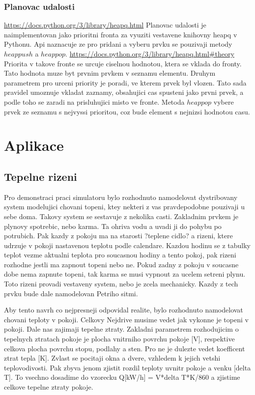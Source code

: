 \subsection{Planovac udalosti}
\url{https://docs.python.org/3/library/heapq.html}
Planovac udalosti je naimplementovan jako prioritni fronta za vyuziti vestavene knihovny heapq v Pythonu. Api naznacuje ze pro pridani a vyberu prvku se pouzivaji metody $heappush$ a $heappop$. \url{https://docs.python.org/3/library/heapq.html#theory} Priorita v takove fronte se urcuje ciselnou hodnotou, ktera se vklada do fronty. Tato hodnota muze byt prvnim prvkem v seznamu elementu. Druhym parametrem pro urceni priority je poradi, ve kterem prvek byl vlozen. Tato sada pravidel umoznuje vkladat zaznamy, obsahujici cas spusteni jako prvni prvek, a podle toho se zaradi na prisluhujici misto ve fronte. Metoda $heappop$ vybere prvek ze seznamu s nejvyssi prioritou, coz bude element s nejnizsi hodnotou casu.
\chapter{Aplikace}
\section{Tepelne rizeni}
Pro demonstraci praci simulatoru bylo rozhodnuto namodelovat dystribovany system modelujici chovani topeni, ktey nekteri z vas pravdepodobne pouzivaji u sebe doma. Takovy system se sestavuje z nekolika casti. Zakladnim prvkem je plynovy spotrebic, nebo karma. Ta ohriva vodu a uvadi ji do pohybu po potrubich. Pak kazdy z pokoju ma na starosti ?teplene cidlo? a rizeni, ktere udrzuje v pokoji nastavenou teplotu podle calendare. Kazdou hodinu se z tabulky teplot vezme aktualni teplota pro soucasnou hodiny a tento pokoj, pak rizeni rozhodne jestli ma zapnout topeni nebo ne. Pokud zadny z pokoju v soucasne dobe nema zapnute topeni, tak karma se musi vypnout za ucelem setreni plynu. Toto rizeni provadi vestaveny system, nebo je zcela mechanicky. Kazdy z tech prvku bude dale namodelovan Petriho sitmi.

Aby tento navrh co nejpresneji odpovidal realite, bylo rozhodnuto namodelovat chovani teploty v pokoji.
Celkovy Nejdrive musime vedet jak vykonne je topeni v pokoji. Dale nas zajimaji tepelne ztraty. Zakladni parametrem rozhodujicim o tepelnych ztratach pokoje je plocha vnitrniho povrchu pokoje [V], respektive celkova plocha povrchu stopu, podlahy a sten. Pro ne je dulezte vedet koefficent ztrat tepla [K]. Zvlast se pocitaji okna a dvere, vzhledem k jejich vetshi teplovodivosti. Pak zbyva jenom zjistit rozdil teploty uvnitr pokoje a venku [delta T]. To vsechno dosadime do vzorecku Q[kW/h] = V*delta T*K/860 a zjistime celkove tepelne ztraty pokoje. %

